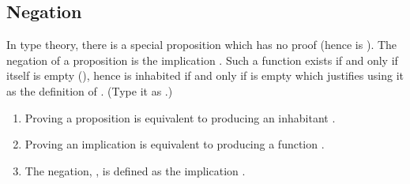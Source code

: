 \documentclass[letterpaper,10pt,english]{sphinxmanual}
\begin{document}
\begin{sphinxVerbatim}[commandchars=\\\{\}]
                

             

             
\end{sphinxVerbatim}


\subsection{Negation}
\label{\detokenize{day1:negation}}
\sphinxAtStartPar
In type theory, there is a special proposition  which has no proof (hence is ).
The negation of a proposition  is the implication .
Such a function exists if and only if  itself is empty (), hence  is inhabited if and only if  is empty which justifies using it as the definition of .
(Type  it as .)
\begin{description}
\begin{enumerate}
%
\item {} 
\sphinxAtStartPar
Proving a proposition  is equivalent to producing an inhabitant .

\item {} 
\sphinxAtStartPar
Proving an implication  is equivalent to producing a function .

\item {} 
\sphinxAtStartPar
The negation, , is defined as the implication .

\end{enumerate}

\end{description}
\end{document}
